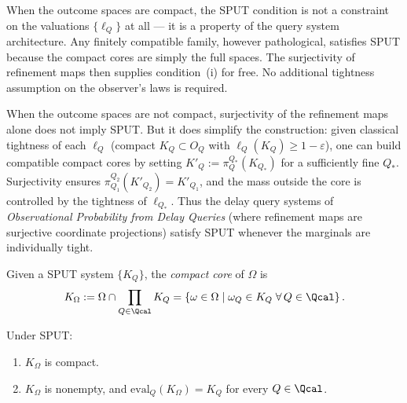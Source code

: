 \begin{remark}
When the outcome spaces are compact, the SPUT condition is not a
constraint on the valuations $\{\ell_Q\}$ at all — it is a property
of the query system architecture.  Any finitely compatible family,
however pathological, satisfies SPUT because the compact cores are
simply the full spaces.  The surjectivity of refinement maps then
supplies condition~(i) for free.  No additional tightness assumption
on the observer's laws is required.
\end{remark}

\begin{remark}
When the outcome spaces are not compact, surjectivity of the
refinement maps alone does not imply SPUT.  But it does simplify the
construction: given classical tightness of each $\ell_Q$ (compact
$K_Q \subset O_Q$ with $\ell_Q(K_Q) \geq 1 - \varepsilon$), one
can build compatible compact cores by setting $K'_Q :=
\pi^{Q_*}_Q(K_{Q_*})$ for a sufficiently fine $Q_*$.  Surjectivity
ensures $\pi^{Q_2}_{Q_1}(K'_{Q_2}) = K'_{Q_1}$, and the mass
outside the core is controlled by the tightness of $\ell_{Q_*}$.
Thus the delay query systems of \emph{Observational Probability from
Delay Queries} (where refinement maps are surjective coordinate
projections) satisfy SPUT whenever the marginals are individually
tight.
\end{remark}

\begin{definition}
Given a SPUT system $\{K_Q\}$, the \emph{compact core} of $\Omega$
is
\[
K_\Omega
:=
\Omega \cap \prod_{Q \in \Qcal} K_Q
=
\left\{
\omega \in \Omega
\;\middle|\;
\omega_Q \in K_Q \;\forall\, Q \in \Qcal
\right\}.
\]
\end{definition}

\begin{proposition}
\label{prop:compact-core}
Under SPUT:
\begin{enumerate}[label=(\roman*)]
\item $K_\Omega$ is compact.
\item $K_\Omega$ is nonempty, and $\mathrm{eval}_Q(K_\Omega) = K_Q$
  for every $Q \in \Qcal$.
\end{enumerate}
\end{proposition}

